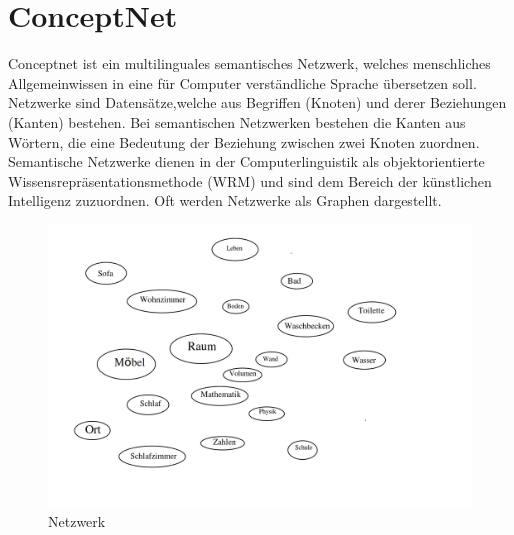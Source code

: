 \section{ConceptNet}
\label{sec:cn}

Conceptnet ist ein multilinguales semantisches Netzwerk, welches menschliches Allgemeinwissen in eine für Computer verständliche Sprache übersetzen soll. Netzwerke sind Datensätze,welche aus Begriffen (Knoten) und derer Beziehungen (Kanten) bestehen\cite{sowa1987semantic}. Bei semantischen Netzwerken bestehen die Kanten aus Wörtern, die eine Bedeutung der Beziehung zwischen zwei Knoten zuordnen. Semantische Netzwerke dienen in der Computerlinguistik als objektorientierte Wissensrepräsentationsmethode (WRM) und sind dem Bereich der künstlichen Intelligenz zuzuordnen\cite{helbig2013semantische}. 
Oft werden Netzwerke als Graphen dargestellt. 

\begin{figure}[h]

	\begin{center}
	
	\includegraphics[width=18cm]{images/Netzwerk.png}
	
	\caption{Netzwerk}
	
	\label{netzwerk_Bild}
	
	\end{center}
	
	
\end{figure}

